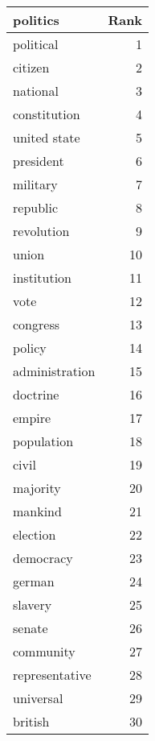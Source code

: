 \begin{table}
\label{tab:politics_terms}
\begin{tabular}{lr}
\toprule
politics & Rank \\
\midrule
political & 1 \\
citizen & 2 \\
national & 3 \\
constitution & 4 \\
united state & 5 \\
president & 6 \\
military & 7 \\
republic & 8 \\
revolution & 9 \\
union & 10 \\
institution & 11 \\
vote & 12 \\
congress & 13 \\
policy & 14 \\
administration & 15 \\
doctrine & 16 \\
empire & 17 \\
population & 18 \\
civil & 19 \\
majority & 20 \\
mankind & 21 \\
election & 22 \\
democracy & 23 \\
german & 24 \\
slavery & 25 \\
senate & 26 \\
community & 27 \\
representative & 28 \\
universal & 29 \\
british & 30 \\
\bottomrule
\end{tabular}
\end{table}
